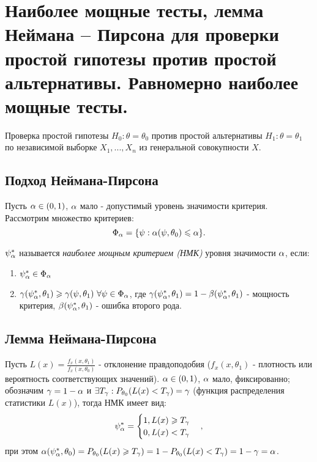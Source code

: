 \section{Наиболее мощные тесты, лемма Неймана – Пирсона для проверки простой гипотезы против простой
альтернативы. Равномерно наиболее мощные тесты.}

Проверка простой гипотезы $H_0 : \theta = \theta_0$ против простой альтернативы $H_1 : \theta = \theta_1$ по независимой выборке $X_1, ..., X_n$ из генеральной совокупности $X$.

\subsection{Подход Неймана-Пирсона}
Пусть $\alpha \in (0, 1)$, $\alpha$ мало - допустимый уровень значимости критерия. Рассмотрим множество критериев:
\[
  \Phi_{\alpha} = \{ \psi : \alpha(\psi, \theta_0) \leqslant \alpha \}\\
.\]

\begin{definition}
  $\psi_{\alpha}^{*}$ называется \textit{наиболее мощным критерием (НМК)} уровня значимости $\alpha$, если:
  \begin{enumerate}
    \item $\psi_{\alpha}^{*} \in \Phi_{\alpha}$
    \item $\gamma(\psi_{\alpha}^{*}, \theta_1) \geqslant \gamma(\psi, \theta_1)~\forall \psi \in \Phi_{\alpha}$,
      где $\gamma(\psi_{\alpha}^{*}, \theta_1) = 1 - \beta(\psi_{\alpha}^{*}, \theta_1)$ - мощность критерия, $\beta(\psi_{\alpha}^{*}, \theta_1)$ - ошибка второго рода.
  \end{enumerate}
\end{definition}

\subsection{Лемма Неймана-Пирсона}

Пусть $L(x) = \frac{f_x(x, \theta_1)}{f_x(x, \theta_0)}$ - отклонение правдоподобия ($f_x(x, \theta_1)$ - плотность или вероятность соответствующих значений).
$\alpha \in (0, 1)$, $\alpha$ мало, фиксированно; обозначим $\gamma = 1 - \alpha$ и $\exists T_{\gamma}: P_{\theta_0}(L(x) < T_{\gamma}) = \gamma$ (функция распределения статистики $L(x)$), тогда НМК имеет вид:
\[
  \psi_{\alpha}^{*} =
  \begin{cases}
    1, L(x) \geqslant T_{\gamma} \\
    0, L(x) < T_{\gamma}
  \end{cases}
,\] 
при этом $\alpha(\psi_{\alpha}^{*}, \theta_0) = P_{\theta_0}(L(x) \geqslant T_{\gamma}) = 1 - P_{\theta_0}(L(x) < T_{\gamma}) = 1 - \gamma = \alpha$.

